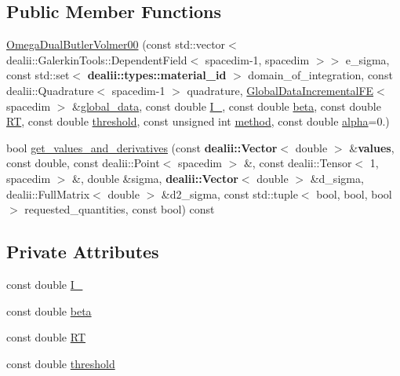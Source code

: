 \subsection*{Public Member Functions}
\begin{DoxyCompactItemize}
\item 
\hyperlink{classincremental_f_e_1_1_omega_dual_butler_volmer00_a4bc64f76770f63e634478f19798d9d27}{Omega\+Dual\+Butler\+Volmer00} (const std\+::vector$<$ dealii\+::\+Galerkin\+Tools\+::\+Dependent\+Field$<$ spacedim-\/1, spacedim $>$$>$ e\+\_\+sigma, const std\+::set$<$ {\bf dealii\+::types\+::material\+\_\+id} $>$ domain\+\_\+of\+\_\+integration, const dealii\+::\+Quadrature$<$ spacedim-\/1 $>$ quadrature, \hyperlink{classincremental_f_e_1_1_global_data_incremental_f_e}{Global\+Data\+Incremental\+FE}$<$ spacedim $>$ \&\hyperlink{classincremental_f_e_1_1_omega_abd23d288a7a4a43f9b528be968cd2113}{global\+\_\+data}, const double \hyperlink{classincremental_f_e_1_1_omega_dual_butler_volmer00_a37608eb032b6e88dd8c9a7d0f553a0bd}{I\+\_}, const double \hyperlink{classincremental_f_e_1_1_omega_dual_butler_volmer00_a8823655ea8aa9eb5668a64c6ee7bf4be}{beta}, const double \hyperlink{classincremental_f_e_1_1_omega_dual_butler_volmer00_a2f32c4f92c11646ed2f6741977d9833f}{RT}, const double \hyperlink{classincremental_f_e_1_1_omega_dual_butler_volmer00_abdc57ace8b842d20ea8f8941b948db41}{threshold}, const unsigned int \hyperlink{classincremental_f_e_1_1_omega_a7600d263ebf98129629e44fa67e8a58c}{method}, const double \hyperlink{classincremental_f_e_1_1_omega_a891688560ec0ad8dc5a0058a7b400269}{alpha}=0.)
\item 
bool \hyperlink{classincremental_f_e_1_1_omega_dual_butler_volmer00_ac3678f68c26fd880c2bd11fc357bc342}{get\+\_\+values\+\_\+and\+\_\+derivatives} (const {\bf dealii\+::\+Vector}$<$ double $>$ \&{\bf values}, const double, const dealii\+::\+Point$<$ spacedim $>$ \&, const dealii\+::\+Tensor$<$ 1, spacedim $>$ \&, double \&sigma, {\bf dealii\+::\+Vector}$<$ double $>$ \&d\+\_\+sigma, dealii\+::\+Full\+Matrix$<$ double $>$ \&d2\+\_\+sigma, const std\+::tuple$<$ bool, bool, bool $>$ requested\+\_\+quantities, const bool) const 
\end{DoxyCompactItemize}
\subsection*{Private Attributes}
\begin{DoxyCompactItemize}
\item 
const double \hyperlink{classincremental_f_e_1_1_omega_dual_butler_volmer00_a37608eb032b6e88dd8c9a7d0f553a0bd}{I\+\_}
\item 
const double \hyperlink{classincremental_f_e_1_1_omega_dual_butler_volmer00_a8823655ea8aa9eb5668a64c6ee7bf4be}{beta}
\item 
const double \hyperlink{classincremental_f_e_1_1_omega_dual_butler_volmer00_a2f32c4f92c11646ed2f6741977d9833f}{RT}
\item 
const double \hyperlink{classincremental_f_e_1_1_omega_dual_butler_volmer00_abdc57ace8b842d20ea8f8941b948db41}{threshold}
\end{DoxyCompactItemize}
